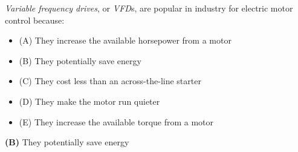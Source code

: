 

{\it Variable frequency drives}, or {\it VFD}s, are popular in industry for electric motor control because:

\begin{itemize}
\item{(A)} They increase the available horsepower from a motor
\vskip 5pt 
\item{(B)} They potentially save energy
\vskip 5pt 
\item{(C)} They cost less than an across-the-line starter
\vskip 5pt 
\item{(D)} They make the motor run quieter
\vskip 5pt 
\item{(E)} They increase the available torque from a motor
\end{itemize}







{\bf (B)} They potentially save energy











